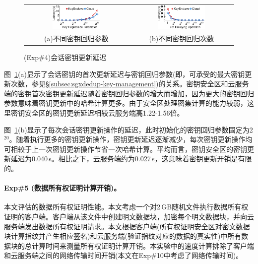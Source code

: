\begin{figure}[!htb]
    \centering
    \begin{tabular}{@{\ }c@{\ }c}
    \includegraphics[width=0.48\textwidth]{pic/sgxdedup/expa5_keyRegression_time.pdf} &
    \includegraphics[width=0.48\textwidth]{pic/sgxdedup/expa5_keyRegression_time_default.pdf} \\
    \mbox{\small (a)不同密钥回归参数} &
    \mbox{\small (b)不同密钥回归次数}
    \end{tabular}
    \caption{(Exp\#4)会话密钥更新延迟}
    \label{fig:sgxdedup-rekeyingLatency}
\end{figure}
    
图~\ref{fig:sgxdedup-rekeyingLatency}(a)显示了会话密钥的首次更新延迟与密钥回归参数(即，可承受的最大密钥更新次数，参见\S\ref{subsec:sgxdedup-key-management})的关系。密钥安全区和云服务端的密钥首次密钥更新延迟随着密钥回归参数的增大而增加，因为更大的密钥回归参数意味着密钥更新中的哈希计算更多。由于安全区处理密集计算的能力较弱\cite{harnik2018SGX}，这里密钥安全区的密钥更新延迟相较云服务端高1.22-1.56倍。

图~\ref{fig:sgxdedup-rekeyingLatency}(b)显示了每次会话密钥更新操作的延迟，此时初始化的密钥回归参数固定为2$^{20}$。随着执行更多的密钥更新操作，密钥更新延迟逐渐减少，每次密钥更新操作均可相较于上一次密钥更新操作节省一次哈希计算。平均而言，密钥安全区的密钥更新延迟为0.040\,s。相比之下，云服务端约为0.027\,s，这意味着密钥更新开销是有限的。

\paragraph*{Exp\#5 (数据所有权证明计算开销)。}本文评估\sysnameS 的数据所有权证明性能。本文考虑一个对2\,GB随机文件执行数据所有权证明的客户端。客户端从该文件中创建明文数据块，加密每个明文数据块，并向云服务端发出数据所有权证明请求。本文根据客户端(所有权证明安全区对密文数据块计算指纹并产生相应签名)和云服务端(验证指纹对应的数据的真实性)中所有数据块的总计算时间来测量所有权证明计算开销。本实验中的速度计算排除了客户端和云服务端之间的网络传输时间开销(本文在Exp\#10中考虑了网络传输时间)。

